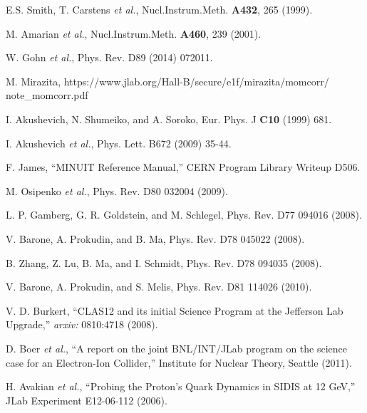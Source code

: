 \begin{thebibliography}{99}
	E.S. Smith, T. Carstens \emph{et al.}, Nucl.Instrum.Meth. \textbf{A432}, 265 (1999).

	M. Amarian \emph{et al.}, Nucl.Instrum.Meth. \textbf{A460}, 239 (2001).

	W. Gohn \emph{et al.}, Phys. Rev. D89 (2014) 072011.

	M. Mirazita, https://www.jlab.org/Hall-B/secure/e1f/mirazita/momcorr/\\note\_momcorr.pdf

	I. Akushevich, N. Shumeiko, and A. Soroko, Eur. Phys. J \textbf{C10} (1999) 681.

	I. Akushevich \emph{et al.}, Phys. Lett. B672 (2009) 35-44.

	F. James, ``MINUIT Reference Manual,'' CERN Program Library Writeup D506.

	M. Osipenko \emph{et al.}, Phys. Rev. D80 032004 (2009).

	L. P. Gamberg, G. R. Goldstein, and M. Schlegel, Phys. Rev. D77 094016 (2008).

	V. Barone, A. Prokudin, and B. Ma, Phys. Rev. D78 045022 (2008).

	B. Zhang, Z. Lu, B. Ma, and I. Schmidt, Phys. Rev. D78 094035 (2008).

	V. Barone, A. Prokudin, and S. Melis, Phys. Rev. D81 114026 (2010).

	V. D. Burkert, ``CLAS12 and its initial Science Program at the Jefferson Lab Upgrade,'' \emph{arxiv:} 0810:4718 (2008).

	D. Boer \emph{et al.}, ``A report on the joint BNL/INT/JLab program on the science case for an Electron-Ion Collider,''
	Institute for Nuclear Theory, Seattle (2011).

	H. Avakian \emph{et al.}, ``Probing the Proton's Quark Dynamics in SIDIS at 12 GeV,'' JLab Experiment E12-06-112 (2006).








\end{thebibliography}






